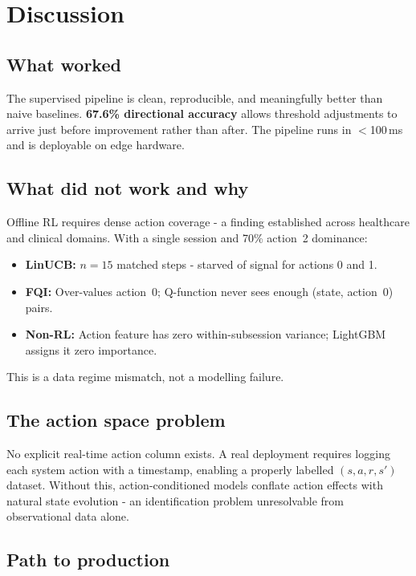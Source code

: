\documentclass[11pt,a4paper]{article}
\begin{document}
\section{Discussion}

\subsection{What worked}

The supervised pipeline is clean, reproducible, and meaningfully better than
naive baselines. \textbf{67.6\% directional accuracy} allows threshold adjustments
to arrive just before improvement rather than after. The pipeline runs in $<$100\,ms
and is deployable on edge hardware.

\subsection{What did not work and why}
\label{sec:disc-failure}

Offline RL requires dense action coverage \cite{gottesman2019, levine2020}
- a finding established across healthcare and clinical domains. With
a single session and 70\% action~2 dominance:
\begin{itemize}
  \item \textbf{LinUCB:} $n=15$ matched steps - starved of signal for actions 0 and 1.
  \item \textbf{FQI:} Over-values action~0; Q-function never sees enough (state, action~0) pairs.
  \item \textbf{Non-RL:} Action feature has zero within-subsession variance; LightGBM assigns it zero importance.
\end{itemize}
This is a data regime mismatch, not a modelling failure.

\subsection{The action space problem}

No explicit real-time action column exists. A real deployment requires logging
each system action with a timestamp, enabling a properly labelled $(s,a,r,s')$
dataset. Without this, action-conditioned models conflate action effects with
natural state evolution - an identification problem unresolvable from
observational data alone.

\subsection{Path to production}
\end{document}
